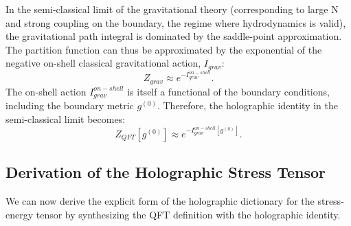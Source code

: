 \documentclass[11pt, letterpaper]{report}
\theoremstyle{plain} %
\theoremstyle{definition} %
\theoremstyle{remark} %
\begin{document}
In the semi-classical limit of the gravitational theory (corresponding to large N and strong coupling on the boundary, the regime where hydrodynamics is valid), the gravitational path integral is dominated by the saddle-point approximation. The partition function can thus be approximated by the exponential of the negative on-shell classical gravitational action, $I_{grav}$:
\begin{equation}
    Z_{grav} \approx e^{-I_{grav}^{on-shell}}.
\end{equation}
The on-shell action $I_{grav}^{on-shell}$ is itself a functional of the boundary conditions, including the boundary metric $g^{(0)}$. Therefore, the holographic identity in the semi-classical limit becomes:
\begin{equation}
    Z_{QFT}[g^{(0)}] \approx e^{-I_{grav}^{on-shell}[g^{(0)}]}.
    \label{eq:holographic_identity_semiclassical}
\end{equation}

\subsection{Derivation of the Holographic Stress Tensor}

We can now derive the explicit form of the holographic dictionary for the stress-energy tensor by synthesizing the QFT definition with the holographic identity.
\end{document}
